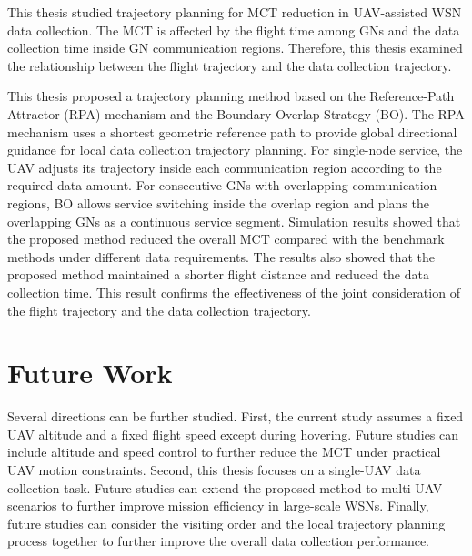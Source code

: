 \documentclass[12pt]{ksthesis}
\begin{document}
\begin{thesis}
{    This thesis studied trajectory planning for MCT reduction in UAV-assisted WSN data collection. The MCT is affected by the flight time among GNs and the data collection time inside GN communication regions. Therefore, this thesis examined the relationship between the flight trajectory and the data collection trajectory.    

    This thesis proposed a trajectory planning method based on the Reference-Path Attractor (RPA) mechanism and the Boundary-Overlap Strategy (BO). The RPA mechanism uses a shortest geometric reference path to provide global directional guidance for local data collection trajectory planning. For single-node service, the UAV adjusts its trajectory inside each communication region according to the required data amount. For consecutive GNs with overlapping communication regions, BO allows service switching inside the overlap region and plans the overlapping GNs as a continuous service segment. Simulation results showed that the proposed method reduced the overall MCT compared with the benchmark methods under different data requirements. The results also showed that the proposed method maintained a shorter flight distance and reduced the data collection time. This result confirms the effectiveness of the joint consideration of the flight trajectory and the data collection trajectory.

    
\section{Future Work}
	Several directions can be further studied. First, the current study assumes a fixed UAV altitude and a fixed flight speed except during hovering. Future studies can include altitude and speed control to further reduce the MCT under practical UAV motion constraints. Second, this thesis focuses on a single-UAV data collection task. Future studies can extend the proposed method to multi-UAV scenarios to further improve mission efficiency in large-scale WSNs. Finally, future studies can consider the visiting order and the local trajectory planning process together to further improve the overall data collection performance.
}\end{thesis}


\singlespace {\large

}


\doublespace

\end{document}

